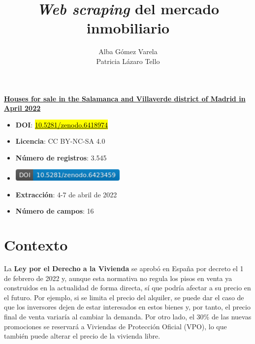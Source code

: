 \documentclass[12pt]{article}
\title{\textit{Web scraping} del mercado inmobiliario}
\author{Alba Gómez Varela\\Patricia Lázaro Tello}
\date{}	%
\begin{document}

\maketitle
\thispagestyle{uoc}

\begin{framed}
	\textbf{\underline{Houses for sale in the Salamanca and Villaverde district of Madrid in April 2022}}
	\begin{multicols}{2}
		\begin{itemize}[topsep=0cm,partopsep=0cm,label={},wide]
			\item \textbf{DOI}: \href{https://doi.org/10.5281/zenodo.6423459}{\hl{10.5281/zenodo.6418974}}
			\item \textbf{Licencia}: CC BY-NC-SA 4.0
			\item \textbf{Número de registros}: 3.545
			\columnbreak
			\item \includegraphics[height=0.6cm]{zenodo.6423459}
			\item \textbf{Extracción}: 4-7 de abril de 2022
			\item \textbf{Número de campos}: 16
		\end{itemize}
	\end{multicols}
\end{framed}

\vspace{-2em}

\section{Contexto}\label{contexto}\vspace{-1.0em}

La \textbf{Ley por el Derecho a la Vivienda} se aprobó en España por decreto el 1 de febrero de 2022 y, aunque esta normativa no regula los pisos en venta ya construidos en la actualidad de forma directa, sí que podría afectar a su precio en el futuro. Por ejemplo, si se limita el precio del alquiler, se puede dar el caso de que los inversores dejen de estar interesados en estos bienes y, por tanto, el precio final de venta variaría al cambiar la demanda. Por otro lado, el 30\% de las nuevas promociones se reservará a Viviendas de Protección Oficial (VPO), lo que también puede alterar el precio de la vivienda libre.
\end{document}
